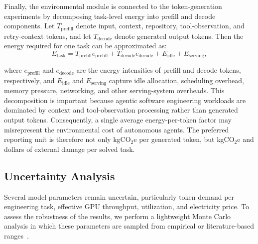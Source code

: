 \documentclass{article}
\begin{document}


Finally, the environmental module is connected to the token-generation experiments by decomposing task-level energy into prefill and decode components. Let $T_{\mathrm{prefill}}$ denote input, context, repository, tool-observation, and retry-context tokens, and let $T_{\mathrm{decode}}$
denote generated output tokens. Then the energy required for one task can be approximated as:
\begin{equation}
E_{\mathrm{task}}
=
T_{\mathrm{prefill}} e_{\mathrm{prefill}}
+
T_{\mathrm{decode}} e_{\mathrm{decode}}
+
E_{\mathrm{idle}}
+
E_{\mathrm{serving}},
\end{equation}

where $e_{\mathrm{prefill}}$ and $e_{\mathrm{decode}}$ are the energy intensities of prefill and decode tokens, respectively, and $E_{\mathrm{idle}}$ and $E_{\mathrm{serving}}$ capture idle allocation, scheduling overhead, memory pressure, networking, and other serving-system overheads. This decomposition is important because agentic software engineering workloads are dominated by
context and tool-observation processing rather than generated output tokens. Consequently, a single average energy-per-token factor may misrepresent the environmental cost of autonomous agents. The preferred reporting unit is therefore not only kgCO$_2$e per generated token, but kgCO$_2$e and dollars of external damage per solved task.



\subsection{Uncertainty Analysis}

Several model parameters remain uncertain, particularly token demand per engineering task, effective GPU throughput, utilization, and electricity price. To assess the robustness of the results, we perform a lightweight Monte Carlo analysis in which these parameters are sampled from empirical or literature-based ranges~\citep{harrison2010MCintroduction}.
\end{document}
